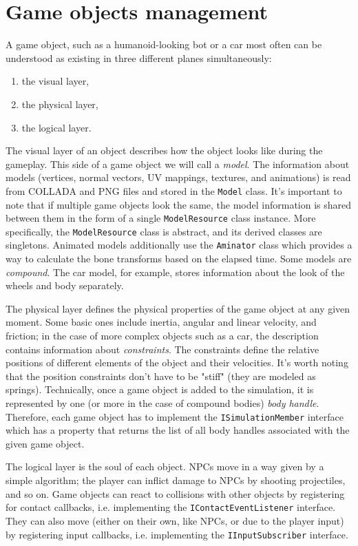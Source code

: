\section{Game objects management}
A game object, such as a humanoid-looking bot or a car most often can be understood as existing in three different planes simultaneously:
\begin{enumerate}
    \item the visual layer,
    \item the physical layer,
    \item the logical layer.
\end{enumerate}
The visual layer of an object describes how the object looks like during the gameplay.
This side of a game object we will call a \textit{model}.
The information about models (vertices, normal vectors, UV mappings, textures, and animations) is read from COLLADA and PNG files and stored in the \texttt{Model} class.
It's important to note that if multiple game objects look the same, the model information is shared between them in the form of a single \texttt{ModelResource} class instance.
More specifically, the \texttt{ModelResource} class is abstract, and its derived classes are singletons.
Animated models additionally use the \texttt{Aminator} class which provides a way to calculate the bone transforms based on the elapsed time.
Some models are \textit{compound}.
The car model, for example, stores information about the look of the wheels and body separately.

The physical layer defines the physical properties of the game object at any given moment.
Some basic ones include inertia, angular and linear velocity, and friction;
in the case of more complex objects such as a car, the description contains information about \textit{constraints}.
The constraints define the relative positions of different elements of the object and their velocities.
It's worth noting that the position constraints don't have to be "stiff" (they are modeled as springs).
Technically, once a game object is added to the simulation, it is represented by one (or more in the case of compound bodies) \textit{body handle}.
Therefore, each game object has to implement the \texttt{ISimulationMember} interface which has a property that returns the list of all body handles associated with the given game object.

The logical layer is the soul of each object.
NPCs move in a way given by a simple algorithm;
the player can inflict damage to NPCs by shooting projectiles, and so on.
Game objects can react to collisions with other objects by registering for contact callbacks, i.e. implementing the \texttt{IContactEventListener} interface.
They can also move (either on their own, like NPCs, or due to the player input) by registering input callbacks, i.e. implementing the \texttt{IInputSubscriber} interface.
